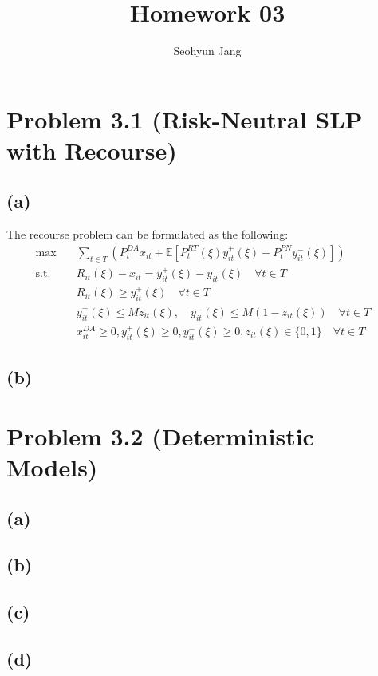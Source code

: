 \documentclass[10pt]{article}
\title{Homework 03}
\author{Seohyun Jang}
\begin{document}
\maketitle

\section{Problem 3.1 (Risk-Neutral SLP with Recourse)}
\subsection{(a)}
The recourse problem can be formulated as the following:
\begin{subequations}
    \begin{align}
        \text{max} \quad & \sum_{t\in T}\left(P_t^{DA}x_{it} + \mathbb{E}\left[P_t^{RT}(\xi)y_{it}^{+}(\xi) - P_t^{PN}y_{it}^{-}(\xi)\right]\right) &\\
        \text{s.t.} \quad & R_{it}(\xi) - x_{it} = y_{it}^{+}(\xi) - y_{it}^{-}(\xi) \quad  \forall t \in T &\\
        & R_{it}(\xi) \geq y^+_{it}(\xi) \quad \forall t \in T &\\
        & y_{it}^{+}(\xi) \leq M z_{it}(\xi), \quad y_{it}^{-}(\xi) \leq M (1 - z_{it}(\xi)) \quad \forall t \in T &\\
        & x_{it}^{DA} \geq 0, y_{it}^{+}(\xi) \geq 0, y_{it}^{-}(\xi) \geq 0, z_{it}(\xi) \in \{0, 1\} \quad \forall t \in T
    \end{align}
    \end{subequations}
\subsection{(b)}

\section{Problem 3.2 (Deterministic Models)}
\subsection{(a)}
\subsection{(b)}
\subsection{(c)}
\subsection{(d)}
\end{document}

